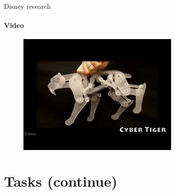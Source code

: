 \documentclass[aspectratio=169]{beamer}
\begin{document}
\begin{frame}[t]{Disney research}
    \framesubtitle{Video}
    \vspace*{-0.6cm}
        \begin{figure}[H]
            \href{http://www.youtube.com/watch?v=DfznnKUwywQ}{
                \centering\includegraphics[height=6cm,keepaspectratio]{image14.jpg}}
        \end{figure}
    \end{frame}

\section*{Tasks (continue)}
\end{document}
